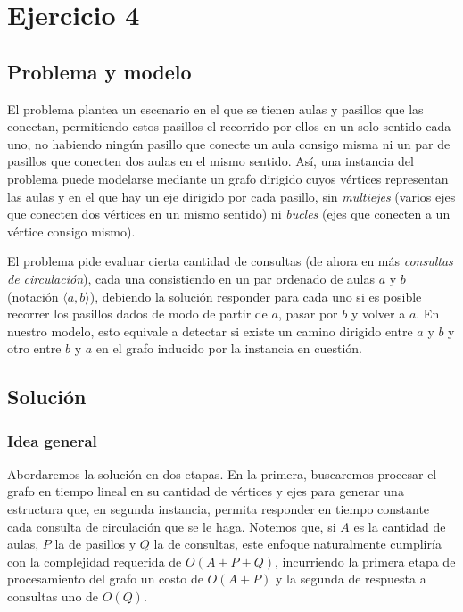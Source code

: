 \section{Ejercicio 4}

\subsection{Problema y modelo}

El problema plantea un escenario en el que se tienen aulas y pasillos que las conectan, permitiendo estos pasillos el recorrido por ellos en un solo sentido cada uno, no habiendo ningún pasillo que conecte un aula consigo misma ni un par de pasillos que conecten dos aulas en el mismo sentido. Así, una instancia del problema puede modelarse mediante un grafo dirigido cuyos vértices representan las aulas y en el que hay un eje dirigido por cada pasillo, sin \textit{multiejes} (varios ejes que conecten dos vértices en un mismo sentido) ni \textit{bucles} (ejes que conecten a un vértice consigo mismo).

El problema pide evaluar cierta cantidad de consultas (de ahora en más \textit{consultas de circulación}), cada una consistiendo en un par ordenado de aulas $a$ y $b$ (notación $\langle a,b \rangle$), debiendo la solución responder para cada uno si es posible recorrer los pasillos dados de modo de partir de $a$, pasar por $b$ y volver a $a$. En nuestro modelo, esto equivale a detectar si existe un camino dirigido entre $a$ y $b$ y otro entre $b$ y $a$ en el grafo inducido por la instancia en cuestión.

\subsection{Solución}

\subsubsection{Idea general}

Abordaremos la solución en dos etapas. En la primera, buscaremos procesar el grafo en tiempo lineal en su cantidad de vértices y ejes para generar una estructura que, en segunda instancia, permita responder en tiempo constante cada consulta de circulación que se le haga. Notemos que, si $A$ es la cantidad de aulas, $P$ la de pasillos y $Q$ la de consultas, este enfoque naturalmente cumpliría con la complejidad requerida de $O(A+P+Q)$, incurriendo la primera etapa de procesamiento del grafo un costo de $O(A+P)$ y la segunda de respuesta a consultas uno de $O(Q)$.

